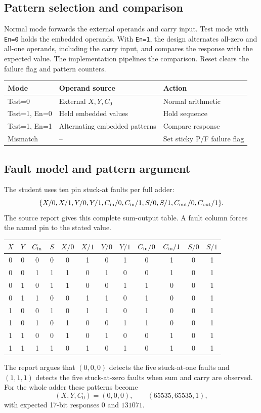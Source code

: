 \documentclass[11pt,a4paper]{article}
\newcommand{\bits}[1]{\texttt{#1}}
\begin{document}
\subsection{Pattern selection and comparison}
Normal mode forwards the external operands and carry input. Test mode with \bits{En=0} holds the embedded operands. With \bits{En=1}, the design alternates all-zero and all-one operands, including the carry input, and compares the response with the expected value. The implementation pipelines the comparison. Reset clears the failure flag and pattern counters.
\begin{center}\begin{tabular}{lll}
\toprule Mode & Operand source & Action\\
\midrule
Test=0 & External $X,Y,C_0$ & Normal arithmetic\\
Test=1, En=0 & Held embedded values & Hold sequence\\
Test=1, En=1 & Alternating embedded patterns & Compare response\\
Mismatch & -- & Set sticky P/F failure flag\\
\bottomrule\end{tabular}\end{center}

\subsection{Fault model and pattern argument}
The student uses ten pin stuck-at faults per full adder:
\[
\{X/0,X/1,Y/0,Y/1,C_{\rm in}/0,C_{\rm in}/1,S/0,S/1,C_{\rm out}/0,C_{\rm out}/1\}.
\]
The source report gives this complete sum-output table. A fault column forces the named pin to the stated value.
\begin{center}\scriptsize\begin{tabular}{ccc|c|cccccccc}
\toprule
$X$&$Y$&$C_{\rm in}$&$S$&$X/0$&$X/1$&$Y/0$&$Y/1$&$C_{\rm in}/0$&$C_{\rm in}/1$&$S/0$&$S/1$\\
\midrule
0&0&0&0&0&1&0&1&0&1&0&1\\
0&0&1&1&1&0&1&0&0&1&0&1\\
0&1&0&1&1&0&0&1&1&0&0&1\\
0&1&1&0&0&1&1&0&1&0&0&1\\
1&0&0&1&0&1&1&0&1&0&0&1\\
1&0&1&0&1&0&0&1&1&0&0&1\\
1&1&0&0&1&0&1&0&0&1&0&1\\
1&1&1&1&0&1&0&1&0&1&0&1\\
\bottomrule\end{tabular}\end{center}
The report argues that $(0,0,0)$ detects the five stuck-at-one faults and $(1,1,1)$ detects the five stuck-at-zero faults when sum and carry are observed. For the whole adder these patterns become
\[
(X,Y,C_0)=(0,0,0),\qquad(65535,65535,1),
\]
with expected 17-bit responses $0$ and $131071$.
\end{document}
